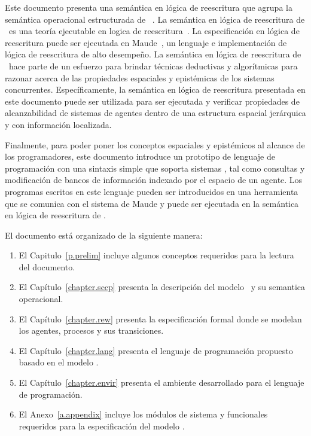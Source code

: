 Este documento presenta una sem\'antica en l\'ogica de reescritura que agrupa la sem\'antica operacional estructurada de \SCCP~\cite{knight:hal-00761116}. La sem\'antica en l\'ogica de reescritura de \SCCP \ es una teor\'ia ejecutable en logica de reescritura~\cite{Meseguer199273}. La especificaci\'on en l\'ogica de reescritura puede ser ejecutada en Maude~\cite{maude-book}, un lenguaje e implementaci\'on de l\'ogica de reescritura de alto desempe\~no. La sem\'antica en l\'ogica de reescritura de \SCCP \ hace parte de un esfuerzo para brindar t\'ecnicas deductivas y algor\'itmicas para razonar acerca de las propiedades espaciales y epist\'emicas de los sistemas concurrentes. Espec\'ificamente, la sem\'antica en l\'ogica de reescritura presentada en este documento puede ser utilizada para ser ejecutada y verificar propiedades de alcanzabilidad de sistemas de agentes dentro de una estructura espacial jer\'arquica y con informaci\'on localizada.

Finalmente, para poder poner los conceptos espaciales y epist\'emicos al alcance de los programadores, este documento introduce un prototipo de lenguaje de programaci\'on con una sintaxis simple que soporta sistemas \SCCP, tal como consultas y modificaci\'on de bancos de informaci\'on indexado por el espacio de un agente. Los programas escritos en este lenguaje pueden ser introducidos en una herramienta que se comunica con el sistema de Maude y puede ser ejecutada en la sem\'antica en l\'ogica de reescritura de \SCCP.

El documento est\'a organizado de la siguiente manera:
\begin{enumerate}
\item El Capitulo~\ref{p.prelim} incluye algunos conceptos requeridos para la lectura del documento.
\item El Cap\'itulo~\ref{chapter.sccp} presenta la descripci\'on del modelo \SCCP \ y su semantica operacional.
\item El Cap\'itulo~\ref{chapter.rew} presenta la especificaci\'on formal donde se modelan los agentes, procesos y sus transiciones. 
\item El Cap\'itulo~\ref{chapter.lang} presenta el lenguaje de programaci\'on propuesto basado en el modelo \SCCP.
\item El Cap\'itulo~\ref{chapter.envir} presenta el ambiente desarrollado para el lenguaje de programaci\'on.
\item El Anexo~\ref{a.appendix} incluye los m\'odulos de sistema y funcionales requeridos para la especificaci\'on del modelo \SCCP.
\end{enumerate}
